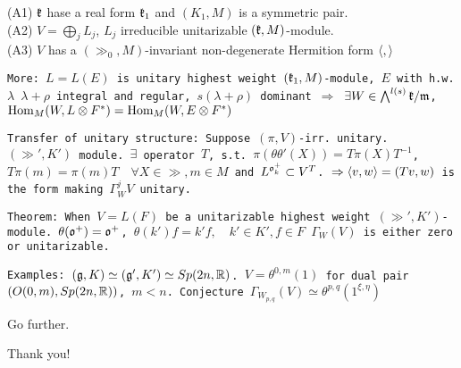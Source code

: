 \documentclass{beamer}
\begin{document}
\begin{frame}[t]
(A1) ${\mathfrak{k}}$ hase a real form ${\mathfrak{k}}_1$ and $(K_1,M)$ is a symmetric pair.\\
(A2) $V = \bigoplus_j L_j$, $L_j$ irreducible unitarizable $({\mathfrak{k}},M)$-module.\\
(A3) $V$ has a $(\gg_0,M)$-invariant non-degenerate Hermition form $\left\langle{},{}\right\rangle$
\end{frame}

\begin{frame}[t]
\tt{More:} $L=L(E)$ is unitary highest weight $({\mathfrak{k}}_1,M)$-module, $E$ with h.w. $\lambda$ 
$\lambda+\rho$ integral and regular,
$s(\lambda+\rho)$ dominant $\Rightarrow$ 
$\exists W\in \bigwedge^{l(s)}{\mathfrak{k}}/{\mathfrak{m}}$, 
$\mathrm{Hom}_M(W,L\otimes F^*) = \mathrm{Hom}_M(W,E\otimes F^*)$
\end{frame}

\begin{frame}[t]
\tt{Transfer of unitary structure:} Suppose $(\pi, V)$-irr. unitary. $(\gg',K')$
module. $\exists$ operator $T$, s.t. 
$\pi(\theta\theta'(X))=T \pi(X)T^{-1}$,
$T\pi(m)=\pi(m)T\quad \forall X\in\gg, m\in M$
and $L^{{\mathfrak{o}}_k^+} \subset V^T$.
$\Rightarrow \left\langle{v},{w}\right\rangle = \left({Tv},{w}\right)$ 
is the form making $\Gamma_W^jV$ unitary.  
\end{frame}

\begin{frame}[t]
\tt{Theorem:} When $V=L(F)$ be a unitarizable highest weight $(\gg',K')$-module.
$\theta({\mathfrak{o}}^+) = {\mathfrak{o}}^+$, 
$\theta(k')f=k'f, \quad k'\in K', f\in F$
$\Gamma_W(V)$ is either zero or unitarizable.
\end{frame}

\begin{frame}[t]
\tt{Examples:} $({\mathfrak{g}},K)\simeq({\mathfrak{g}}',K')\simeq Sp(2n,{\mathbb{R}})$.
$V=\theta^{0,m}(1)$ for dual pair $(O(0,m),Sp(2n,{\mathbb{R}}))$, $m<n$.
Conjecture $\Gamma_{W_{p,q}}(V) \simeq \theta^{p,q}(1^{\xi,\eta})$
\end{frame}

\begin{frame}[t]
\begin{center}
\large Go further. 
\end{center}
\end{frame}

\begin{frame}[t]
\begin{center}
\large Thank you!
\end{center}
\end{frame}
\end{document}
